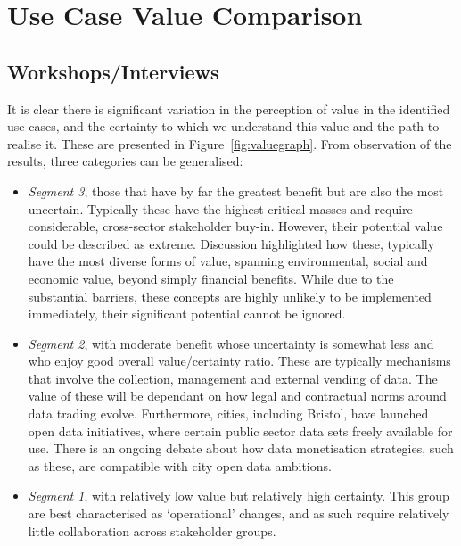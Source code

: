 \documentclass[journal]{IEEEtran}
\begin{document}
\section{Use Case Value Comparison}\label{usecasecomp}

\subsection{Workshops/Interviews}

It is clear there is significant variation in the perception of value in the
identified use cases, and the certainty to which we understand this
value and the path to realise it. These are presented in
Figure~\ref{fig:valuegraph}. From observation of the results, three
categories can be generalised:

\begin{itemize}
\item {\emph{Segment 3}}, those that have by far the greatest benefit
but are also the most uncertain. Typically these have the highest
critical masses and require considerable, cross-sector stakeholder
buy-in. However, their potential value could be described as
extreme. Discussion highlighted how these, typically have the most
diverse forms of value, spanning environmental, social and economic
value, beyond simply financial benefits. While due to the substantial
barriers, these concepts are highly unlikely to be implemented
immediately, their significant potential cannot be ignored.
\item {\emph{Segment 2}}, with moderate benefit whose uncertainty is
somewhat less and who enjoy good overall value/certainty ratio. These
are typically mechanisms that involve the collection, management and
external vending of data. The value of these will be dependant on how
legal and contractual norms around data trading evolve. Furthermore,
cities, including Bristol, have launched open data initiatives, where
certain public sector data sets freely available for use. There is an
ongoing debate about how data monetisation strategies, such as these,
are compatible with city open data ambitions.
\item {\emph{Segment 1}}, with relatively low value but relatively
high certainty. This group are best characterised as `operational'
changes, and as such require relatively little collaboration across
stakeholder groups.
\end{itemize}
\end{document}
